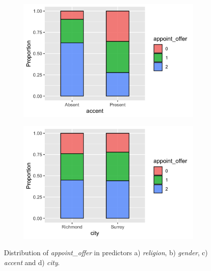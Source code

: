 \documentclass[11pt]{article}
\begin{document}
\begin{figure}[!t]
\begin{subfigure}{0.45\textwidth}
        \caption{}
    \end{subfigure}
    \begin{subfigure}{0.45\textwidth}
        \centering
        \includegraphics[width=\textwidth]{../../Plots/Proportions_appoint_offer_accent.png}
        \caption{}
    \end{subfigure}
    \begin{subfigure}{0.45\textwidth}
        \centering
        \includegraphics[width=\textwidth]{../../Plots/Proportions_appoint_offer_city.png}
        \caption{}
    \end{subfigure}
    \caption{Distribution of \textit{appoint\_offer} in predictors a) \textit{religion}, b) \textit{gender}, c) \textit{accent} and d) \textit{city}.}
    \label{fig:eda2}
\end{figure}
\end{document}
